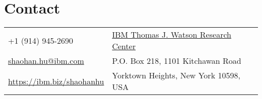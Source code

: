 
\section{\sc Contact}
\vspace{.01in}
\begin{tabular}{@{}p{3.3in}p{4in}}
+1 (914) 945-2690  & {\href{http://research.ibm.com/labs/watson/index.shtml}{IBM Thomas J. Watson Research Center}} \\
{\href{mailto:shaohan.hu@ibm.com}{shaohan.hu@ibm.com}} & {P.O. Box 218, 1101 Kitchawan Road} \\
{\url{https://ibm.biz/shaohanhu}} & Yorktown Heights, New York 10598, USA \\
\end{tabular}
